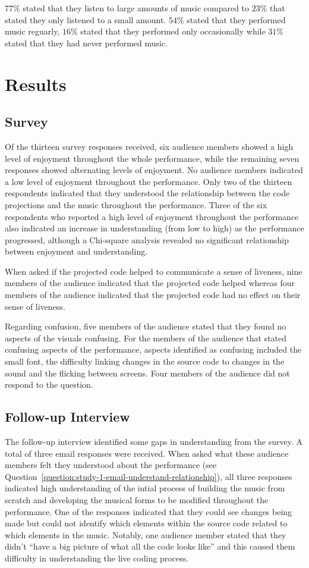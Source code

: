 $77\%$ stated that they listen to large amounts of music compared to $23\%$ that stated they only listened to a small amount. $54\%$ stated that they performed music reguarly, $16\%$ stated that they performed only occasionally while $31\%$ stated that they had never performed music.

\section{Results}

\subsection{Survey}

Of the thirteen survey responses received, six audience members showed a high level of enjoyment throughout the whole performance, while the remaining seven responses showed alternating levels of enjoyment. No audience members indicated a low level of enjoyment throughout the performance.  Only two of the thirteen respondents indicated that they understood the relationship between the code projections and the music throughout the performance. Three of the six respondents who reported a high level of enjoyment throughout the performance also indicated an increase in understanding (from low to high) as the performance progressed, although a Chi-square analysis revealed no significant relationship between enjoyment and understanding. 

When asked if the projected code helped to communicate a sense of liveness, nine members of the audience indicated that the projected code helped whereas four members of the audience indicated that the projected code had no effect on their sense of liveness.

Regarding confusion, five members of the audience stated that they found no aspects of the visuals confusing. For the members of the audience that stated confusing aspects of the performance, aspects identified as confusing included the small font, the difficulty linking changes in the source code to changes in the sound and the flicking between screens. Four members of the audience did not respond to the question.

\subsection{Follow-up Interview}

The follow-up interview identified some gaps in understanding from the survey. A total of three email responses were received. When asked what these audience members felt they understood about the performance (see Question~\ref{question:study-1-email-understand-relationship}), all three responses indicated high understanding of the intial process of building the music from scratch and developing the musical forms to be modified throughout the performance. One of the responses indicated that they could see changes being made but could not identify which elements within the source code related to which elements in the music. Notably, one audience member stated that they didn't ``have a big picture of what all the code looks like'' and this caused them difficulty in understanding the live coding process. 

